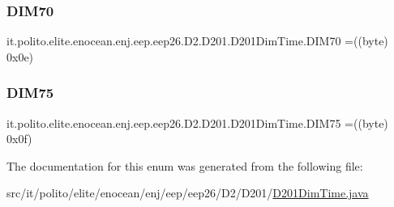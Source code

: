\subsubsection{\texorpdfstring{D\+I\+M70}{DIM70}}
{\footnotesize\ttfamily it.\+polito.\+elite.\+enocean.\+enj.\+eep.\+eep26.\+D2.\+D201.\+D201\+Dim\+Time.\+D\+I\+M70 =((byte) 0x0e)}

\hypertarget{enumit_1_1polito_1_1elite_1_1enocean_1_1enj_1_1eep_1_1eep26_1_1_d2_1_1_d201_1_1_d201_dim_time_a437fce14d59666790fb48ca38e795e2b}{}\label{enumit_1_1polito_1_1elite_1_1enocean_1_1enj_1_1eep_1_1eep26_1_1_d2_1_1_d201_1_1_d201_dim_time_a437fce14d59666790fb48ca38e795e2b} 
\subsubsection{\texorpdfstring{D\+I\+M75}{DIM75}}
{\footnotesize\ttfamily it.\+polito.\+elite.\+enocean.\+enj.\+eep.\+eep26.\+D2.\+D201.\+D201\+Dim\+Time.\+D\+I\+M75 =((byte) 0x0f)}



The documentation for this enum was generated from the following file\+:\begin{DoxyCompactItemize}
\item 
src/it/polito/elite/enocean/enj/eep/eep26/\+D2/\+D201/\hyperlink{_d201_dim_time_8java}{D201\+Dim\+Time.\+java}\end{DoxyCompactItemize}
